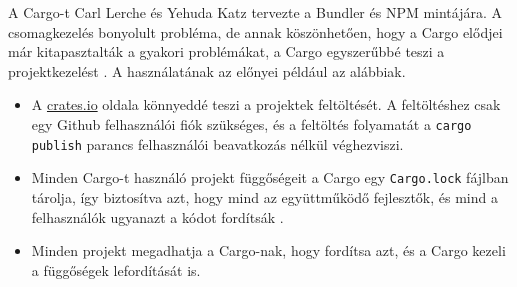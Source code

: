 A Cargo-t Carl Lerche és Yehuda Katz tervezte a Bundler és NPM mintájára. 
A csomagkezelés bonyolult probléma, de annak köszönhetően, hogy a Cargo elődjei már kitapasztalták a gyakori problémákat,
a Cargo egyszerűbbé teszi a projektkezelést \cite{cargo:blog}. A használatának az előnyei például az alábbiak.
\begin{itemize}
    \item A \url{crates.io} oldala könnyeddé teszi a projektek feltöltését. 
    A feltöltéshez csak egy Github felhasználói fiók szükséges, és a feltöltés folyamatát a \texttt{cargo publish} parancs
    felhasználói beavatkozás nélkül véghezviszi.
    \item Minden Cargo-t használó projekt függőségeit a Cargo egy \texttt{Cargo.lock} fájlban tárolja,
    így biztosítva azt, hogy mind az együttműködő fejlesztők, és mind a felhasználók ugyanazt a kódot fordítsák \cite{cargo:dependency_management}.
    \item Minden projekt megadhatja a Cargo-nak, hogy fordítsa azt, és a Cargo kezeli a függőségek lefordítását is.
\end{itemize}


